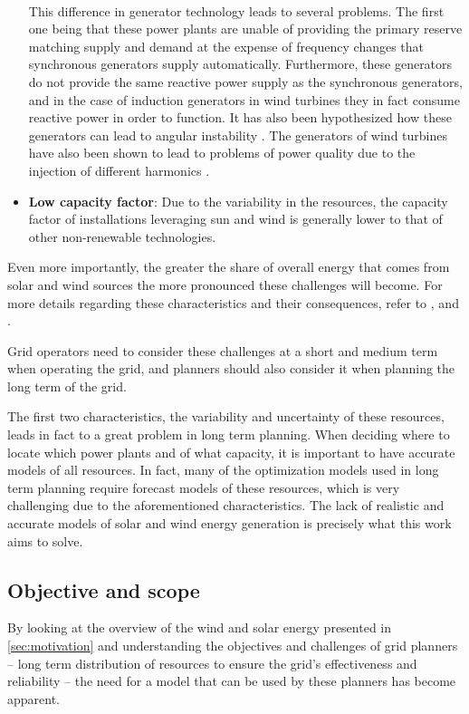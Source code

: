 \begin{itemize}
    \\This difference in generator technology leads to several problems. The first one being that these power plants are unable of providing the primary reserve matching supply and demand at the expense of frequency changes that synchronous generators supply automatically. Furthermore, these generators do not provide the same reactive power supply as the synchronous generators, and in the case of induction generators in wind turbines they in fact consume reactive power in order to function. It has also been hypothesized how these generators can lead to angular instability \cite{vittal_raja_ayyanar_2023}. The generators of wind turbines have also been shown to lead to problems of power quality due to the injection of different harmonics \cite{muljadi_butterfield_chacon_romanowitz_2006}. 
    \item \textbf{Low capacity factor}: Due to the variability in the resources, the capacity factor of installations leveraging sun and wind is generally lower to that of other non-renewable technologies. 
\end{itemize}

Even more importantly, the greater the share of overall energy that comes from solar and wind sources the more pronounced these challenges will become. For more details regarding these characteristics and their consequences, refer to \cite{ahmed_fahad_2020}, \cite{kumar_pandey_sinha_2016} and \cite{steen_goop_2014}.

Grid operators need to consider these challenges at a short and medium term when operating the grid, and planners should also consider it when planning the long term of the grid. 

The first two characteristics, the variability and uncertainty of these resources, leads in fact to a great problem in long term planning. When deciding where to locate which power plants and of what capacity, it is important to have accurate models of all resources. In fact, many of the optimization models used in long term planning require forecast models of these resources, which is very challenging due to the aforementioned characteristics. The lack of realistic and accurate models of solar and wind energy generation is precisely what this work aims to solve.

\subsection{Objective and scope}
\label{sec:objective-and-scope}
By looking at the overview of the wind and solar energy presented in \autoref{sec:motivation}  and understanding the objectives and challenges of grid planners -- long term distribution of resources to ensure the grid's effectiveness and reliability -- the need for a model that can be used by these planners has become apparent. 

